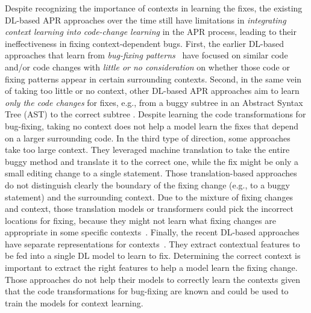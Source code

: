 Despite recognizing the importance of contexts in learning the fixes,
the existing DL-based APR approaches over the time still have
limitations in {\em integrating context learning into code-change
  learning} in the APR process, leading to their ineffectiveness in
fixing context-dependent bugs. First, the earlier DL-based approaches
that learn from {\em bug-fixing
  patterns}~\cite{white2016deep,gupta2017deepfix} have focused on
similar code and/or code changes with {\em little or no consideration}
on whether those code or fixing patterns appear in certain surrounding
contexts. Second, in the same vein of taking too little or no context,
other DL-based APR approaches aim to learn {\em only the code changes}
for fixes, e.g., from a buggy subtree in an Abstract Syntax Tree (AST)
to the correct subtree \cite{chakrabortycodit,see2017get}. Despite
learning the code transformations for bug-fixing, taking no context
does not help a model learn the fixes that depend on a larger
surrounding code. In the third type of direction, some
approaches~\cite{hata2018learning,tufano2019learning,tufano2018empirical}
take too large context. They leveraged machine translation to take the
entire buggy method and translate it to the correct one, while the fix
might be only a small editing change to a single statement. Those
translation-based approaches do not distinguish clearly the boundary
of the fixing change (e.g., to a buggy statement) and the surrounding
context. Due to the mixture of fixing changes and context, those
translation models or transformers could pick the incorrect locations
for fixing, because they might not learn what fixing changes are
appropriate in some specific contexts~\cite{icse20}. Finally, the
recent DL-based approaches have separate representations for
contexts~\cite{chen2018sequencer,cure-icse21,lutellier2020coconut}.
They extract contextual features to be fed into a single DL model to
learn to fix. Determining the correct context is important to extract
the right features to help a model learn the fixing change. Those
approaches do not help their models to correctly learn the contexts
given that the code transformations for bug-fixing are known and could
be used to train the models for context learning.



